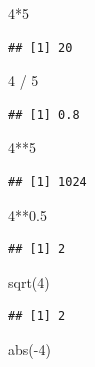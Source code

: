 \documentclass[
]{book}
\newenvironment{Shaded}{\begin{snugshade}}{\end{snugshade}}
\newcommand{\DecValTok}[1]{\textcolor[rgb]{0.00,0.00,0.81}{#1}}
\newcommand{\FloatTok}[1]{\textcolor[rgb]{0.00,0.00,0.81}{#1}}
\newcommand{\FunctionTok}[1]{\textcolor[rgb]{0.00,0.00,0.00}{#1}}
\newcommand{\NormalTok}[1]{#1}
\newcommand{\SpecialCharTok}[1]{\textcolor[rgb]{0.00,0.00,0.00}{#1}}
\begin{document}
\begin{Shaded}
\begin{Highlighting}[]
\DecValTok{4}\SpecialCharTok{*}\DecValTok{5}
\end{Highlighting}
\end{Shaded}

\begin{verbatim}
## [1] 20
\end{verbatim}

\begin{Shaded}
\begin{Highlighting}[]
\DecValTok{4} \SpecialCharTok{/} \DecValTok{5}
\end{Highlighting}
\end{Shaded}

\begin{verbatim}
## [1] 0.8
\end{verbatim}

\begin{Shaded}
\begin{Highlighting}[]
\DecValTok{4}\SpecialCharTok{**}\DecValTok{5}
\end{Highlighting}
\end{Shaded}

\begin{verbatim}
## [1] 1024
\end{verbatim}

\begin{Shaded}
\begin{Highlighting}[]
\DecValTok{4}\SpecialCharTok{**}\FloatTok{0.5}
\end{Highlighting}
\end{Shaded}

\begin{verbatim}
## [1] 2
\end{verbatim}

\begin{Shaded}
\begin{Highlighting}[]
\FunctionTok{sqrt}\NormalTok{(}\DecValTok{4}\NormalTok{)}
\end{Highlighting}
\end{Shaded}

\begin{verbatim}
## [1] 2
\end{verbatim}

\begin{Shaded}
\begin{Highlighting}[]
\FunctionTok{abs}\NormalTok{(}\SpecialCharTok{{-}}\DecValTok{4}\NormalTok{)}
\end{Highlighting}
\end{Shaded}
\end{document}
